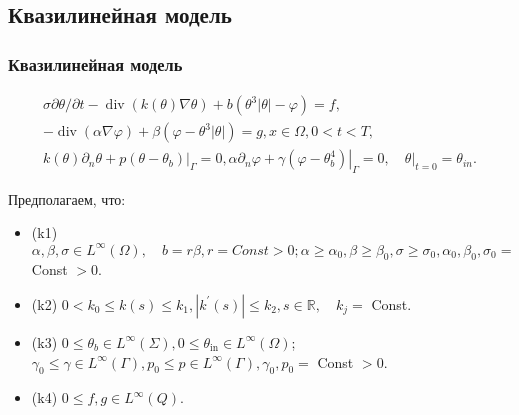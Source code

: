 \subsection{Квазилинейная модель}\label{subsec:ql}
\begin{frame}
    \frametitle{Квазилинейная модель}
    \begin{gather}
        \sigma \partial \theta / \partial t
        -\operatorname{div}(k(\theta) \nabla \theta)
        +b\left(\theta^{3}|\theta|-\varphi\right)=f, \label{eq:1_6:1}\\
        -\operatorname{div}(\alpha \nabla \varphi)
        +\beta\left(\varphi-\theta^{3}|\theta|\right)=g, x \in \Omega, 0<t<T, \label{eq:1_6:2}\\
        k(\theta) \partial_{n} \theta+\left.p\left(\theta-\theta_{b}\right)\right|_{\Gamma}=0,
        \alpha \partial_{n} \varphi
        +\left.\gamma\left(\varphi-\theta_{b}^{4}\right)\right|_{\Gamma}=0,
        \left.\quad \theta\right|_{t=0}=\theta_{in}.\label{eq:1_6:3}
    \end{gather}

    Предполагаем, что:
    \begin{itemize}
        \item (k1) $\alpha, \beta, \sigma \in L^{\infty}(\Omega),
        \quad b=r \beta, r = Const > 0; \alpha \geq \alpha_{0}, \beta \geq \beta_{0},
        \sigma \geq \sigma_{0}, \alpha_{0}, \beta_{0}, \sigma_{0}=$ Const $>0$.

        \item (k2) $0<k_{0} \leq k(s) \leq k_{1},\left|k^{\prime}(s)\right| \leq k_{2},
        s \in \mathbb{R}, \quad k_{j}=$ Const.

        \item (k3) $0 \leq \theta_{b} \in L^{\infty}(\Sigma), 0 \leq \theta_{\text{in}}
        \in L^{\infty}(\Omega)$; $\gamma_{0} \leq \gamma \in L^{\infty}(\Gamma), p_{0}
        \leq p \in L^{\infty}(\Gamma), \gamma_{0}, p_{0}=$ Const $>0$.

        \item (k4) $0 \leq f, g \in L^{\infty}(Q).$
    \end{itemize}

\end{frame}


